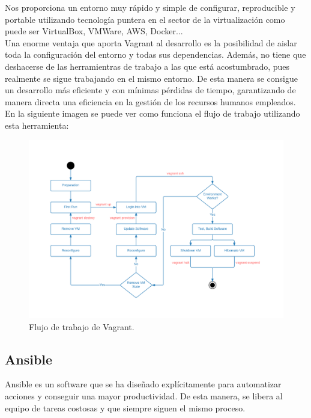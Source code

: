 Nos proporciona un entorno muy rápido y simple de configurar, reproducible y portable utilizando
tecnología puntera en el sector de la virtualización como puede ser VirtualBox, VMWare, AWS, Docker...\\

Una enorme ventaja que aporta Vagrant al desarrollo es la posibilidad de aislar toda la configuración
del entorno y todas sus dependencias. Además, no tiene que deshacerse de las herramientras de trabajo
a las que está acostumbrado, pues realmente se sigue trabajando en el mismo entorno. 
De esta manera se consigue un desarrollo más eficiente y con mínimas pérdidas de tiempo, garantizando 
de manera directa una eficiencia en la gestión de los recursos humanos empleados.\\

En la siguiente imagen se puede ver como funciona el flujo de trabajo utilizando esta herramienta:

\begin{figure}[H]
	\centering
	\includegraphics[scale=0.65]{imagenes/vagrant-workflow.png}
	\caption{Flujo de trabajo de Vagrant. \label{fig:figura6}}
\end{figure}



\subsection{Ansible}

Ansible\cite{ansible} es un software que se ha diseñado explícitamente para automatizar acciones y
conseguir una mayor productividad. De esta manera, se libera al equipo de tareas costosas
y que siempre siguen el mismo proceso.\\

